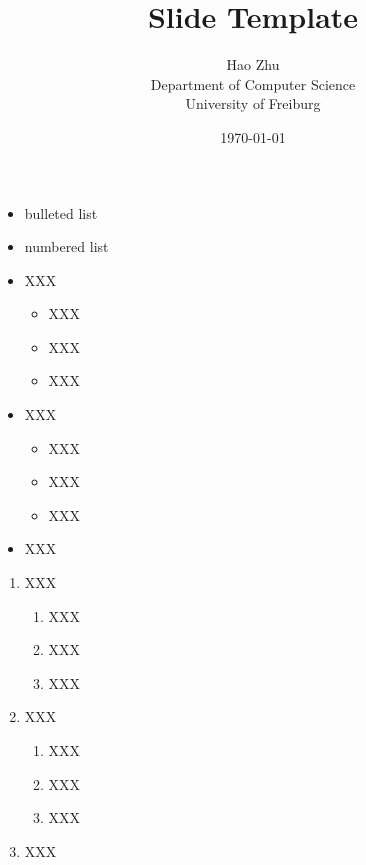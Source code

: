 \documentclass[landscape]{foils}
\title{Slide Template}
\author{
    Hao Zhu\\[10pt]
    Department of Computer Science\\
    University of Freiburg
}
\date{\today}
\begin{document}
\maketitle

\vf
\begin{itemize}\itemsep=20pt
    \item bulleted list
    \item numbered list
\end{itemize}
\vf

\begin{itemize}\itemsep=12pt
    \item XXX
        \vspace*{0.5ex}
        \begin{itemize}
        \item XXX
        \item XXX
        \item XXX
        \end{itemize}
    \item XXX
        \vspace*{0.5ex}
        \begin{itemize}
            \item XXX
            \item XXX
            \item XXX
        \end{itemize}
    \item XXX
\end{itemize}

\begin{enumerate}\itemsep=12pt
    \item XXX
        \vspace*{0.5ex}
        \begin{enumerate}
        \item XXX
        \item XXX
        \item XXX
        \end{enumerate}
    \item XXX
        \vspace*{0.5ex}
        \begin{enumerate}
            \item XXX
            \item XXX
            \item XXX
        \end{enumerate}
    \item XXX
\end{enumerate}
\end{document}
